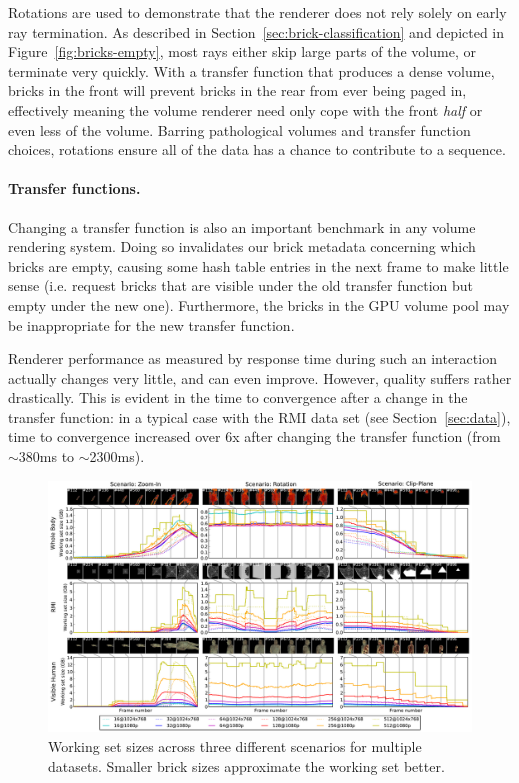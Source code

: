 Rotations are used to demonstrate that the renderer does not rely
solely on early ray termination.  As described in
Section~\ref{sec:brick-classification} and depicted in
Figure~\ref{fig:bricks-empty}, most rays either skip large parts of
the volume, or terminate very quickly.  With a transfer function that
produces a dense volume, bricks in the front will prevent bricks in the
rear from ever being paged in, effectively meaning the volume renderer
need only cope with the front \emph{half} or even less of the volume.
Barring pathological volumes and transfer function choices, rotations
ensure all of the data has a chance to contribute to a sequence.

\paragraph{Transfer functions.} Changing a transfer function is also
an important benchmark in any volume rendering system.  Doing so
invalidates our brick metadata concerning which bricks are empty,
causing some hash table entries in the next frame to make little sense
(i.e. request bricks that are visible under the old transfer function
but empty under the new one).  Furthermore, the bricks in the GPU
volume pool may be inappropriate for the new transfer function.

Renderer performance as measured by response time during such an
interaction actually changes very little, and can even improve.
However, quality suffers rather drastically.  This is evident in the
time to convergence after a change in the transfer function: in a
typical case with the RMI data set (see Section~\ref{sec:data}), time
to convergence increased over 6x after changing the transfer function
(from $\sim$380ms to $\sim$2300ms).

\begin{figure}
  \centering
  \includegraphics[width=0.98\linewidth]{images/rg/workingSets1-150dpi.pdf}
  \caption{Working set sizes across three different scenarios for
  multiple datasets.  Smaller brick sizes approximate the working set
  better.}
  \label{fig:working-set}
\end{figure}

